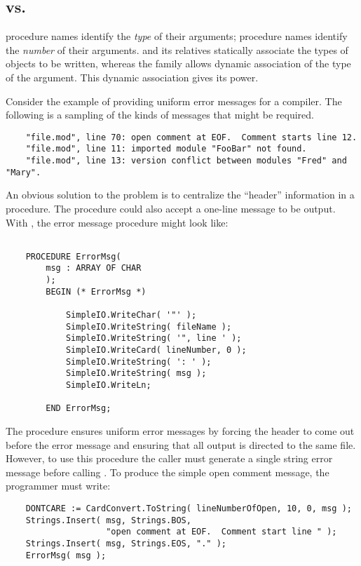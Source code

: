 \subsection{ vs. }

 procedure names identify the {\em type} of their arguments;
 procedure names identify the {\em number} of their
arguments.   and its relatives statically associate the
types of objects to be written, whereas the  family allows 
dynamic association of the type of the argument.  This dynamic association
gives  its power.

Consider the example of providing uniform error messages for a compiler.
The following is a sampling of the kinds of messages that
might be required.
\begin{verbatim}
    "file.mod", line 70: open comment at EOF.  Comment starts line 12.
    "file.mod", line 11: imported module "FooBar" not found.
    "file.mod", line 13: version conflict between modules "Fred" and "Mary".
\end{verbatim}    

An obvious solution to the problem is to centralize the ``header'' information
in a procedure.
The procedure could also accept a one-line message to be output.
With , the error message procedure might look like:

\begin{verbatim}

    PROCEDURE ErrorMsg(
        msg : ARRAY OF CHAR
        );
        BEGIN (* ErrorMsg *)
        
            SimpleIO.WriteChar( '"' );
            SimpleIO.WriteString( fileName );
            SimpleIO.WriteString( '", line ' );
            SimpleIO.WriteCard( lineNumber, 0 );
            SimpleIO.WriteString( ': ' );
            SimpleIO.WriteString( msg );
            SimpleIO.WriteLn;
        
        END ErrorMsg;
\end{verbatim}    
The procedure  ensures uniform error messages by forcing the
header to come out before the error message and ensuring that all
output is directed to the same file.
However, to use this
procedure the caller must generate a single string error message
before calling .  
To produce the simple open comment message, 
the programmer must write:
\begin{verbatim}
    DONTCARE := CardConvert.ToString( lineNumberOfOpen, 10, 0, msg );
    Strings.Insert( msg, Strings.BOS, 
                    "open comment at EOF.  Comment start line " );
    Strings.Insert( msg, Strings.EOS, "." );
    ErrorMsg( msg );
\end{verbatim}    
    
